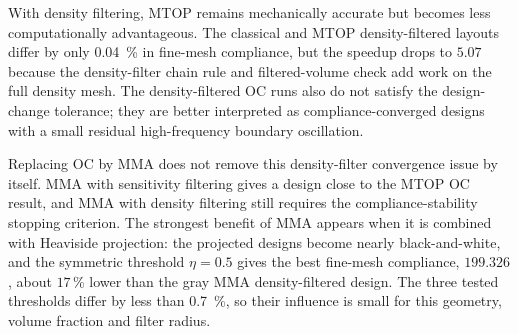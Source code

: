 \documentclass[11pt,a4paper]{article}
\begin{document}
With density filtering, MTOP remains mechanically accurate but becomes less computationally advantageous. The classical and MTOP density-filtered layouts differ by only \SI{0.04}{\percent} in fine-mesh compliance, but the speedup drops to $5.07$ because the density-filter chain rule and filtered-volume check add work on the full density mesh. The density-filtered OC runs also do not satisfy the design-change tolerance; they are better interpreted as compliance-converged designs with a small residual high-frequency boundary oscillation.

Replacing OC by MMA does not remove this density-filter convergence issue by itself. MMA with sensitivity filtering gives a design close to the MTOP OC result, and MMA with density filtering still requires the compliance-stability stopping criterion. The strongest benefit of MMA appears when it is combined with Heaviside projection: the projected designs become nearly black-and-white, and the symmetric threshold $\eta=0.5$ gives the best fine-mesh compliance, $199.326$, about $17$\,\% lower than the gray MMA density-filtered design. The three tested thresholds differ by less than \SI{0.7}{\percent}, so their influence is small for this geometry, volume fraction and filter radius.



\clearpage

\end{document}
